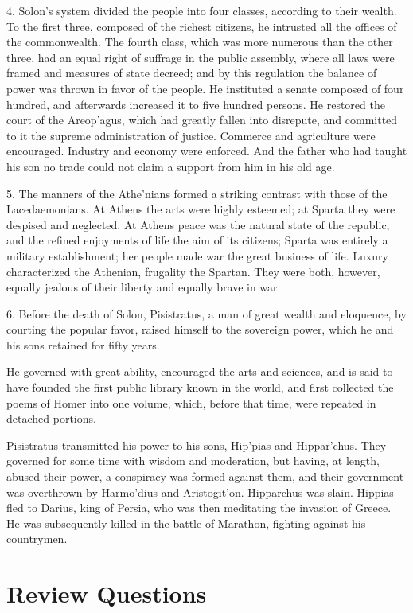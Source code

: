 \documentclass[openany,a4paper]{memoir}
\begin{document}
4. Solon's system divided the people into four classes, 
according to their wealth. To the first three, composed of 
the richest citizens, he intrusted all the offices of the commonwealth. The fourth class, which was more numerous 
than the other three, had an equal right of suffrage in the 
public assembly, where all laws were framed and measures 
of state decreed; and by this regulation the balance of power 
was thrown in favor of the people. He instituted a senate 
composed of four hundred, and afterwards increased it to 
five hundred persons. He restored the court of the Areop'agus, which had greatly fallen into disrepute, and committed to it the supreme administration of justice. Commerce and agriculture were encouraged. Industry and 
economy were enforced. And the father who had taught 
his son no trade could not claim a support from him in his 
old age. 

5. The manners of the Athe'nians formed a striking contrast with those of the Lacedaemonians. At Athens the 
arts were highly esteemed; at Sparta they were despised 
and neglected. At Athens peace was the natural state of 
the republic, and the refined enjoyments of life the aim of 
its citizens; Sparta was entirely a military establishment; 
her people made war the great business of life. Luxury 
characterized the Athenian, frugality the Spartan. They 
were both, however, equally jealous of their liberty and 
equally brave in war. 


6. Before the death of Solon, Pisistratus, a man of great 
wealth and eloquence, by courting the popular favor, raised 
himself to the sovereign power, which he and his sons retained for fifty years. 

He governed with great ability, encouraged the arts and 
sciences, and is said to have founded the first public library 
known in the world, and first collected the poems of Homer 
into one volume, which, before that time, were repeated in 
detached portions. 

Pisistratus transmitted his power to his sons, Hip'pias 
and Hippar'chus. They governed for some time with wisdom 
and moderation, but having, at length, abused their power, a 
conspiracy was formed against them, and their government 
was overthrown by Harmo'dius and Aristogit'on. Hipparchus was slain. Hippias fled to Darius, king of Persia, 
who was then meditating the invasion of Greece. He was 
subsequently killed in the battle of Marathon, fighting against 
his countrymen. 

\section{Review Questions}
\end{document}
